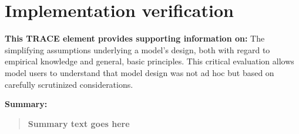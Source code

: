 \documentclass{article}[12pt]
\begin{document}
\section{Implementation verification}\label{sec:IpVer}
\textbf{This TRACE element provides supporting information on:} The simplifying assumptions underlying a model's design, both with regard to empirical knowledge and general, basic principles. This critical evaluation allows model users to understand that model design was not ad hoc but based on carefully scrutinized considerations. 

\textbf{Summary:}
\begin{verse}
\textbf{ 
Summary text goes here
}
\end{verse}

\end{document}
